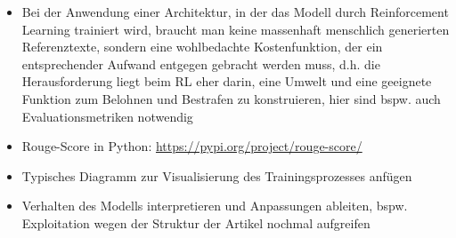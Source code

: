 \begin{itemize}
	\item Bei der Anwendung einer Architektur, in der das Modell durch Reinforcement Learning trainiert wird, braucht man keine massenhaft menschlich generierten Referenztexte, sondern eine wohlbedachte Kostenfunktion, der ein entsprechender Aufwand entgegen gebracht werden muss, d.h. die Herausforderung liegt beim RL eher darin, eine Umwelt und eine geeignete Funktion zum Belohnen und Bestrafen zu konstruieren, hier sind bspw. auch Evaluationsmetriken notwendig
	\item Rouge-Score in Python: \url{https://pypi.org/project/rouge-score/}
	\item Typisches Diagramm zur Visualisierung des Trainingsprozesses anfügen
	\item Verhalten des Modells interpretieren und Anpassungen ableiten, bspw. Exploitation wegen der Struktur der Artikel nochmal aufgreifen
\end{itemize}
